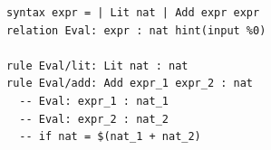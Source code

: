 \begin{lstlisting}[style=spectecexample,morekeywords={[2]{Lit,Add}},emph={Eval}]
syntax expr = | Lit nat | Add expr expr
relation Eval: expr : nat hint(input %0)

rule Eval/lit: Lit nat : nat
rule Eval/add: Add expr_1 expr_2 : nat
  -- Eval: expr_1 : nat_1
  -- Eval: expr_2 : nat_2
  -- if nat = $(nat_1 + nat_2)
\end{lstlisting}
